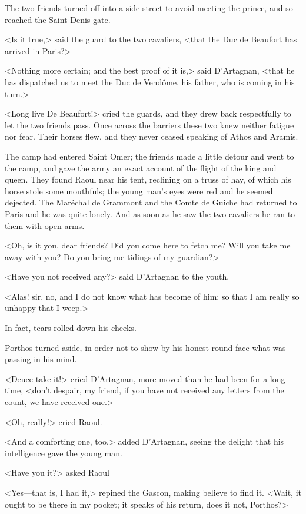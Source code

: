 The two friends turned off into a side street to avoid meeting the prince, and so reached the Saint Denis gate.

<Is it true,> said the guard to the two cavaliers, <that the Duc de Beaufort has arrived in Paris?>

<Nothing more certain; and the best proof of it is,> said D'Artagnan, <that he has dispatched us to meet the Duc de Vendôme, his father, who is coming in his turn.>

<Long live De Beaufort!> cried the guards, and they drew back respectfully to let the two friends pass. Once across the barriers these two knew neither fatigue nor fear. Their horses flew, and they never ceased speaking of Athos and Aramis.

The camp had entered Saint Omer; the friends made a little detour and went to the camp, and gave the army an exact account of the flight of the king and queen. They found Raoul near his tent, reclining on a truss of hay, of which his horse stole some mouthfuls; the young man's eyes were red and he seemed dejected. The Maréchal de Grammont and the Comte de Guiche had returned to Paris and he was quite lonely. And as soon as he saw the two cavaliers he ran to them with open arms.

<Oh, is it you, dear friends? Did you come here to fetch me? Will you take me away with you? Do you bring me tidings of my guardian?>

<Have you not received any?> said D'Artagnan to the youth.

<Alas! sir, no, and I do not know what has become of him; so that I am really so unhappy that I weep.>

In fact, tears rolled down his cheeks.

Porthos turned aside, in order not to show by his honest round face what was passing in his mind.

<Deuce take it!> cried D'Artagnan, more moved than he had been for a long time, <don't despair, my friend, if you have not received any letters from the count, we have received one.>

<Oh, really!> cried Raoul.

<And a comforting one, too,> added D'Artagnan, seeing the delight that his intelligence gave the young man.

<Have you it?> asked Raoul

<Yes—that is, I had it,> repined the Gascon, making believe to find it. <Wait, it ought to be there in my pocket; it speaks of his return, does it not, Porthos?>

